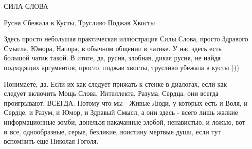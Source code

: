  
 
 
 
 

СИЛА СЛОВА 💛 💙 💛 💙 💛 💙 💛 💙 💛 💙          

Русня Сбежала в Кусты, Трусливо Поджав Хвосты 

Здесь просто небольшая практическая иллюстрация Силы Слова, просто Здравого
Смысла, Юмора, Напора, в обычном общении в чатике. У нас здесь есть большой
чатик такой. В итоге, да, русня, злобная, дикая русня, не найдя подходящих
аргументов, просто, поджав хвосты, трусливо убежала в кусты ))) 

Понимаете, да. Если их как следует прижать к стенке в диалогах, если как
следует включить Мощь Слова, Интеллекта, Разума, Сердца, они всегда
проигрывают. ВСЕГДА. Потому что мы - Живые Люди, у которых есть и Воля, и
Сердце, и Разум, и Юмор, и Здравый Смысл, а они здесь - всего лишь жалкие
информационные зомби, донельзя накачанные злобой, ненавистью, и ложью, вот и
все, однообразные, серые, безликие, воистину мертвые души, если тут вспомнить
еще Николая Гоголя. 
